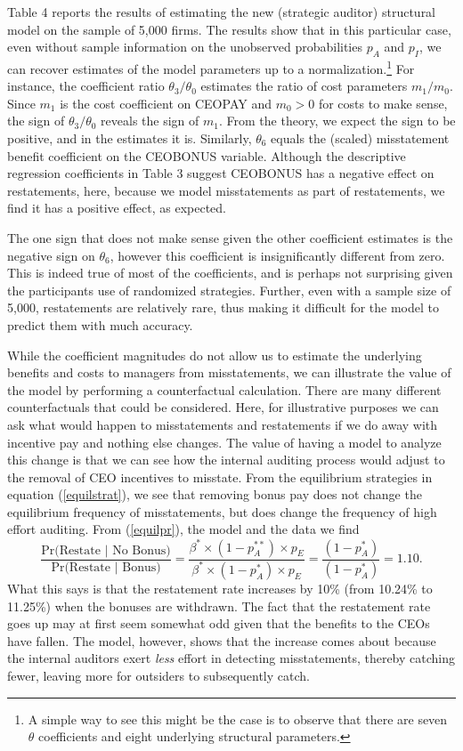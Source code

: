 \documentclass[14pt]{article}
\begin{document}
Table 4 reports the results of estimating the new (strategic auditor) structural model on 
the sample of 5,000 firms. The results show that in this particular case, even without sample information on the unobserved probabilities $p_A$ and 
$p_I$, we can recover estimates of the model parameters up to a normalization.\footnote{A simple way to
see this might be the case is to observe that there are seven $\theta$ coefficients and eight underlying structural parameters.}
For instance, the coefficient ratio $\theta_3/\theta_0$ estimates the ratio of cost parameters $m_1/m_0$. Since $m_1$ is the cost coefficient on CEOPAY and $m_0>0$
for costs to make sense, the sign of $\theta_3/\theta_0$ reveals the sign of $m_1$.
From the theory, we expect the sign to be positive, and in the estimates it is. Similarly,
$\theta_6$ equals the (scaled) misstatement benefit coefficient on the CEOBONUS variable.
Although the descriptive regression coefficients in Table 3 suggest CEOBONUS has a
negative effect on restatements, here, because we model misstatements as part of
restatements, we find it has a positive effect, as expected.

The one sign that
does not make sense given the other coefficient estimates is the negative sign on $\theta_6$,
however this coefficient is insignificantly different from zero. This is indeed true of most of
the coefficients, and is perhaps not surprising given the participants use of randomized strategies.
Further, even with a sample size of 5,000, restatements are relatively rare, thus making
it difficult for the model to predict them with much accuracy. 

While
the coefficient magnitudes do not allow us to estimate the underlying benefits and costs to managers from
misstatements, we can illustrate the value of the model by performing a counterfactual calculation.
There are many different counterfactuals that could be considered. Here, for illustrative purposes
we can ask what would happen to misstatements and restatements if we 
do away with incentive pay and nothing else changes. The value of having a model to analyze this
change is that we can see how the internal auditing process would adjust to the removal of 
CEO incentives to misstate. 
From the equilibrium strategies in equation (\ref{equilstrat}), we see that removing bonus pay does not
change the equilibrium frequency of misstatements, but does change the frequency of high effort auditing.
From (\ref{equilpr}), the model and the data we find
$$ \dfrac{\mbox{Pr(Restate }\vert \mbox{ No Bonus)}}{\mbox{Pr(Restate }\vert \mbox{ Bonus)}}=\dfrac{\beta^* \times (1-p_A^{**}) \times p_{E}}
{\beta^* \times (1-p_A^{*}) \times p_{E}} = \dfrac{(1-p_A^*)}{(1-p_A^*)} = 1.10.$$
What this says is that the restatement rate increases by 10\% (from 10.24\% to 11.25\%) when the bonuses
are withdrawn. The fact that the restatement rate goes up may at first seem somewhat odd
given that the benefits to the CEOs have fallen. The model, however, shows that the increase 
comes about because the internal auditors exert {\it less} effort in detecting
misstatements, thereby catching fewer, leaving more for outsiders to subsequently catch.  
\end{document}
